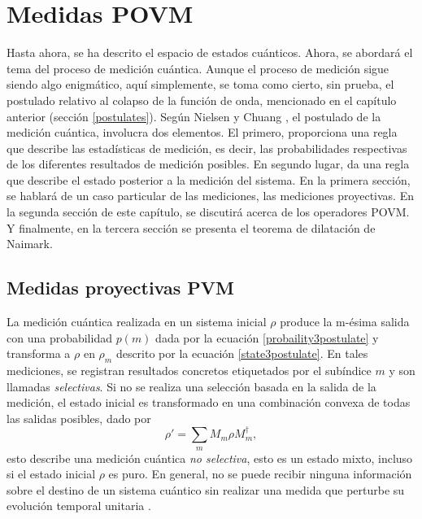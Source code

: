 \chapter{Medidas POVM}\label{MedidaPOVM}
Hasta ahora, se ha descrito el espacio de estados cuánticos. Ahora, se abordará el tema del proceso de medición cuántica. Aunque el proceso de medición  sigue siendo algo enigmático, aquí simplemente, se toma como cierto, sin prueba, el postulado relativo al colapso de la función de onda, mencionado en el capítulo anterior (sección {\ref{postulates}}). Según Nielsen y Chuang {\cite{nielsen_chuang_2010}}, el postulado de la medición cuántica, involucra dos elementos. El primero, proporciona una regla que describe las estadísticas de medición, es decir, las probabilidades respectivas de los diferentes resultados de medición posibles. En segundo lugar, da una regla que describe el estado posterior a la medición del sistema.  En la primera sección, se hablará de un caso particular de las mediciones, las mediciones proyectivas. En la segunda sección de este capítulo, se discutirá acerca de los operadores POVM\@. Y finalmente, en la tercera sección se presenta el teorema de dilatación de Naimark. 











\section{Medidas proyectivas PVM}
La medición cuántica realizada en un sistema inicial $\rho$ produce  la m-ésima salida con una probabilidad $p(m)$ dada por la ecuación {\ref{probaility3postulate}} y transforma a $\rho $ en $\rho_m$ descrito por la ecuación {\ref{state3postulate}}. En tales mediciones, se registran resultados concretos etiquetados por el subíndice $m$ y son llamadas \textit{selectivas}. Si no se realiza una selección basada en la salida de la medición, el estado inicial es transformado en una combinación convexa de todas las salidas posibles, dado por 
\begin{equation}\label{non-selective-measure}
	\rho'=\sum_m M_m\rho M_m^\dagger,
\end{equation}
esto describe una medición cuántica \textit{no selectiva}, esto es un estado mixto, incluso si el estado inicial $\rho$ es puro. En general, no se puede recibir ninguna información sobre el destino de un sistema cuántico sin realizar una medida que perturbe su evolución temporal unitaria {\cite{2007geometry}}.

